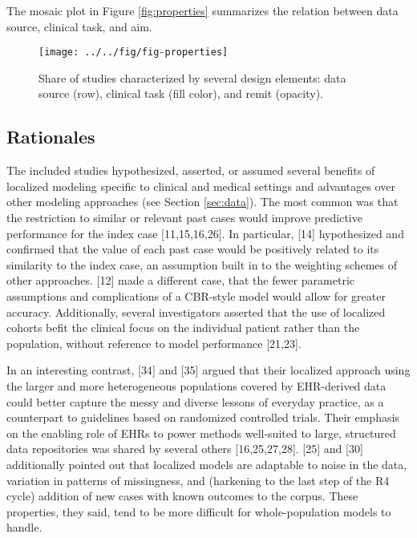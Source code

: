 \documentclass[preprint, 3p,
authoryear]{elsarticle} %
\begin{document}
The mosaic plot in Figure \ref{fig:properties} summarizes the relation
between data source, clinical task, and aim.

\begin{figure}

{\centering \texttt{[image: ../../fig/fig-properties]} 

}

\caption{\label{fig:properties}Share of studies characterized by several design elements: data source (row), clinical task (fill color), and remit (opacity).}\label{fig:fig:properties}
\end{figure}

\hypertarget{rationales}{%
\subsection{Rationales}\label{rationales}}

\label{sec:rationales}

The included studies hypothesized, asserted, or assumed several benefits
of localized modeling specific to clinical and medical settings and
advantages over other modeling approaches (see Section \ref{sec:data}).
The most common was that the restriction to similar or relevant past
cases would improve predictive performance for the index case
{[}11,15,16,26{]}. In particular, {[}14{]} hypothesized and confirmed
that the value of each past case would be positively related to its
similarity to the index case, an assumption built in to the weighting
schemes of other approaches. {[}12{]} made a different case, that the
fewer parametric assumptions and complications of a CBR-style model
would allow for greater accuracy. Additionally, several investigators
asserted that the use of localized cohorts befit the clinical focus on
the individual patient rather than the population, without reference to
model performance {[}21,23{]}.

In an interesting contrast, {[}34{]} and {[}35{]} argued that their
localized approach using the larger and more heterogeneous populations
covered by EHR-derived data could better capture the messy and diverse
lessons of everyday practice, as a counterpart to guidelines based on
randomized controlled trials. Their emphasis on the enabling role of
EHRs to power methods well-suited to large, structured data repositories
was shared by several others {[}16,25,27,28{]}. {[}25{]} and {[}30{]}
additionally pointed out that localized models are adaptable to noise in
the data, variation in patterns of missingness, and (harkening to the
last step of the R4 cycle) addition of new cases with known outcomes to
the corpus. These properties, they said, tend to be more difficult for
whole-population models to handle.
\end{document}
